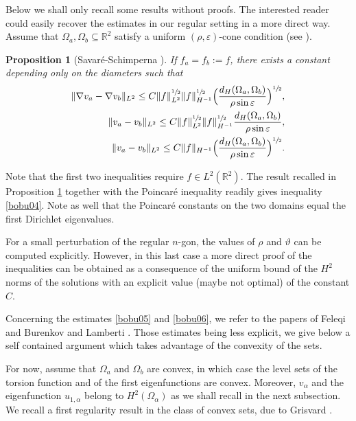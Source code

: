 \documentclass[JEP,XML,SOM,Unicode,ThmDefs,NoFloatCountersInSection,published]{cedram}
\theoremstyle{plain}
\newtheorem{propo}[thm]{Proposition}
\theoremstyle{definition}
\def\R{\mathbb{R}}
\newcommand{\Om}{\Omega}
\newcommand{\sq}{\subseteq}
\begin{document}
Below we shall only recall some results without proofs. The interested reader could easily recover the estimates in our regular setting in a more direct way.
Assume that $\Om_a, \Om_b\sq \R^2$ satisfy a uniform $(\rho, \varepsilon)$-cone condition (see \cite[Def.\,2.6]{SaSc02}).
\begin{propo}[Savaré-Schimperna \cite{SaSc02}]\label{bobu7} If $f_a=f_b:=f$, there exists a constant depending only on the diameters such that
\begin{align}\label{bobu03}
\|\nabla v_a- \nabla v_b\|_{L^2} \le C\|f\|_{L^2}^{\sfrac 12} \|f\|_{H^{-1} }^{\sfrac 12} \Big (\frac{d_H(\Om_a, \Om_b)}{\rho \sin \varepsilon}\Big)^{\sfrac 12},
\\
\label{bobu08}
\|v_a- v_b\|_{L^2} \le C\|f\|_{L^2}^{\sfrac 12} \|f\|_{H^{-1} }^{\sfrac 12} \frac{d_H(\Om_a, \Om_b)}{\rho \sin \varepsilon},
\\
\label{bobu30}
\|v_a- v_b\|_{L^2} \le C \|f\|_{H^{-1} } \Big (\frac{d_H(\Om_a, \Om_b)}{\rho \sin \varepsilon}\Big)^{\sfrac 12}.
\end{align}

\end{propo}
Note that the first two inequalities require $f\in L^2(\R^2)$. The result recalled in Proposition \ref{bobu7} together with the Poincaré inequality readily gives inequality \eqref{bobu04}. Note as well that the Poincaré constants on the two domains equal the first Dirichlet eigenvalues.

For a small perturbation of the regular $n$-gon, the values of $\rho$ and $\vartheta $ can be computed explicitly.
However, in this last case a more direct proof of the inequalities can be obtained as a consequence of the uniform bound of the $H^2$ norms of the solutions with an explicit value (maybe not optimal) of the constant $C$.

Concerning the estimates \eqref{bobu05} and \eqref{bobu06}, we refer to the papers of Feleqi \cite{FE16} and Burenkov and Lamberti \cite{BuLa12}. Those estimates being less explicit, we give below a self contained argument which takes advantage of the convexity of the sets.

For now, assume that $\Om_a$ and $\Om_b$ are convex, in which case the level sets of the torsion function and of the first eigenfunctions are convex. Moreover, $v_\alpha$ and the eigenfunction $u_{1,\alpha}$ belong to $H^2(\Om_\alpha)$ as we shall recall in the next subsection. We recall a first regularity result in the class of convex sets, due to Grisvard \cite[Th.\,3.1.2.1]{grisvard}.
\end{document}
